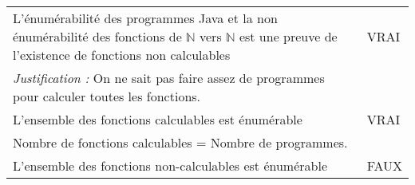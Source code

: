 \begin{longtable}{p{13cm}|l}
  L'énumérabilité des programmes 	Java et la non énumérabilité des fonctions de $\mathbb{N}$ vers $\mathbb{N}$ est une preuve de l'existence de fonctions non calculables & VRAI \\
  \textit{Justification :} On ne sait pas faire assez de programmes pour calculer toutes les fonctions. \\ \hline
  L'ensemble des fonctions calculables est énumérable & VRAI \\
  Nombre de fonctions calculables = Nombre de programmes. \\ \hline
  L'ensemble des fonctions non-calculables est énumérable & FAUX \\
\end{longtable}
